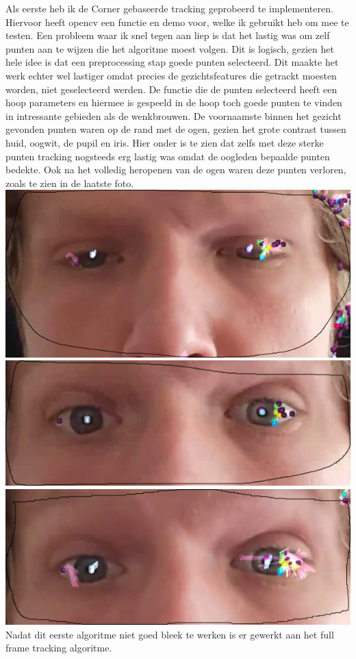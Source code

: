 \documentclass[11pt]{article}
\begin{document}
    Als eerste heb ik de Corner gebaseerde tracking geprobeerd te implementeren.
    Hiervoor heeft opencv een functie en demo voor, welke ik gebruikt heb om mee te testen.
    Een probleem waar ik snel tegen aan liep is dat het lastig was om zelf punten aan te wijzen die het algoritme moest volgen.
    Dit is logisch, gezien het hele idee is dat een preprocessing stap goede punten selecteerd. 
    Dit maakte het werk echter wel lastiger omdat precies de gezichtsfeatures die getrackt moesten worden, niet geselecteerd werden. 
    De functie die de punten selecteerd heeft een hoop parameters en hiermee is gespeeld in de hoop toch goede punten te vinden in intressante gebieden als de wenkbrouwen.
    De voornaamste binnen het gezicht gevonden punten waren op de rand met de ogen, gezien het grote contrast tussen huid, oogwit, de pupil en iris.
    Hier onder is te zien dat zelfs met deze sterke punten tracking nogsteeds erg lastig was omdat de oogleden bepaalde punten bedekte. 
    Ook na het volledig heropenen van de ogen waren deze punten verloren, zoals te zien in de laatste foto. 
    \newline
    \includegraphics[width=0.6\linewidth]{Images/path21.png}
    \includegraphics[width=0.6\linewidth]{Images/path22.png}
    \includegraphics[width=0.6\linewidth]{Images/path23.png}
    \newline
    \newline
    Nadat dit eerste algoritme niet goed bleek te werken is er gewerkt aan het full frame tracking algoritme. 
\end{document}
